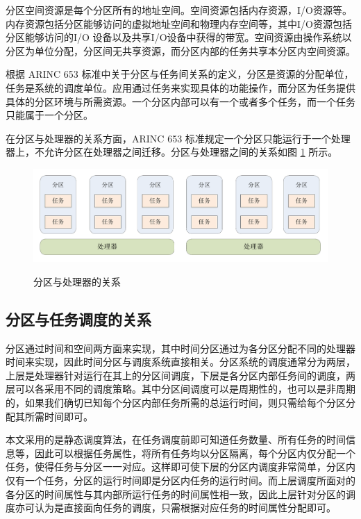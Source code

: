 分区空间资源是每个分区所有的地址空间。空间资源包括内存资源，I/O资源等。内存资源包括分区能够访问的虚拟地址空间和物理内存空间等，其中I/O资源包括分区能够访问的I/O 设备以及共享I/O设备中获得的带宽。空间资源由操作系统以分区为单位分配，分区间无共享资源，而分区内部的任务共享本分区内空间资源。

根据 ARINC 653 标准中关于分区与任务间关系的定义，分区是资源的分配单位，任务是系统的调度单位。应用通过任务来实现具体的功能操作，而分区为任务提供具体的分区环境与所需资源。一个分区内部可以有一个或者多个任务，而一个任务只能属于一个分区。

在分区与处理器的关系方面，ARINC 653 标准规定一个分区只能运行于一个处理器上，不允许分区在处理器之间迁移。分区与处理器之间的关系如图 \ref{basic-fig-partition} 所示。

\begin{figure}[!hbt]
  \centering
  \includegraphics[height=25ex]{figure/basic-partition.pdf}\\
  \caption{分区与处理器的关系}\label{basic-fig-partition}
\end{figure}

\subsection{分区与任务调度的关系}

分区通过时间和空间两方面来实现，其中时间分区通过为各分区分配不同的处理器时间来实现，因此时间分区与调度系统直接相关。分区系统的调度通常分为两层，上层是处理器针对运行在其上的分区间调度，下层是各分区内部任务间的调度，两层可以各采用不同的调度策略。其中分区间调度可以是周期性的，也可以是非周期的，如果我们确切已知每个分区内部任务所需的总运行时间，则只需给每个分区分配其所需时间即可。

本文采用的是静态调度算法，在任务调度前即可知道任务数量、所有任务的时间信息等，因此可以根据任务属性，将所有任务均以分区隔离，每个分区内仅分配一个任务，使得任务与分区一一对应。这样即可使下层的分区内调度非常简单，分区内仅有一个任务，分区的运行时间即是分区内任务的运行时间。而上层调度所面对的各分区的时间属性与其内部所运行任务的时间属性相一致，因此上层针对分区的调度亦可认为是直接面向任务的调度，只需根据对应任务的时间属性分配即可。

